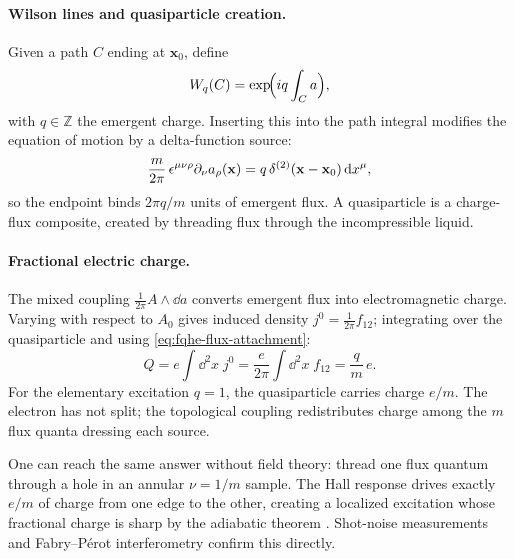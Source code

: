 \paragraph{Wilson lines and quasiparticle creation.}
Given a path $C$ ending at $\mathbf{x}_0$, define
\begin{equation}
  W_q(C) = \exp\!\Bigl(iq\int_C a\Bigr),
  \label{eq:fqhe-wilson-line}
\end{equation}
with $q\in\mathbb{Z}$ the emergent charge. Inserting this into the path integral modifies the equation of motion by a delta-function source:
\begin{equation}
  \frac{m}{2\pi}\,\epsilon^{\mu\nu\rho}\partial_\nu a_\rho(\mathbf{x})
  =
  q\,\delta^{(2)}(\mathbf{x} - \mathbf{x}_0)\,\mathrm{d} x^\mu,
  \label{eq:fqhe-flux-attachment}
\end{equation}
so the endpoint binds $2\pi q/m$ units of emergent flux. A quasiparticle is a charge-flux composite, created by threading flux through the incompressible liquid.

\paragraph{Fractional electric charge.}
The mixed coupling $\frac{1}{2\pi}A\wedge\dd a$ converts emergent flux into electromagnetic charge. Varying with respect to $A_0$ gives induced density $j^0 = \frac{1}{2\pi}f_{12}$; integrating over the quasiparticle and using \eqref{eq:fqhe-flux-attachment}:
\begin{equation}
  Q = e\int\dd^2x\;j^0 = \frac{e}{2\pi}\int\dd^2x\;f_{12} = \frac{q}{m}\,e.
  \label{eq:fqhe-fractional-charge}
\end{equation}
For the elementary excitation $q=1$, the quasiparticle carries charge $e/m$. The electron has not split; the topological coupling redistributes charge among the $m$ flux quanta dressing each source.

One can reach the same answer without field theory: thread one flux quantum through a hole in an annular $\nu = 1/m$ sample. The Hall response drives exactly $e/m$ of charge from one edge to the other, creating a localized excitation whose fractional charge is sharp by the adiabatic theorem \cite{Stern2008AnyonsQHEReview}. Shot-noise measurements \cite{Saminadayar1997FractionalCharge,dePicciotto1997FractionalCharge} and Fabry--P\'{e}rot interferometry \cite{CaminoZhouGoldman2005ABSuperperiod} confirm this directly.

